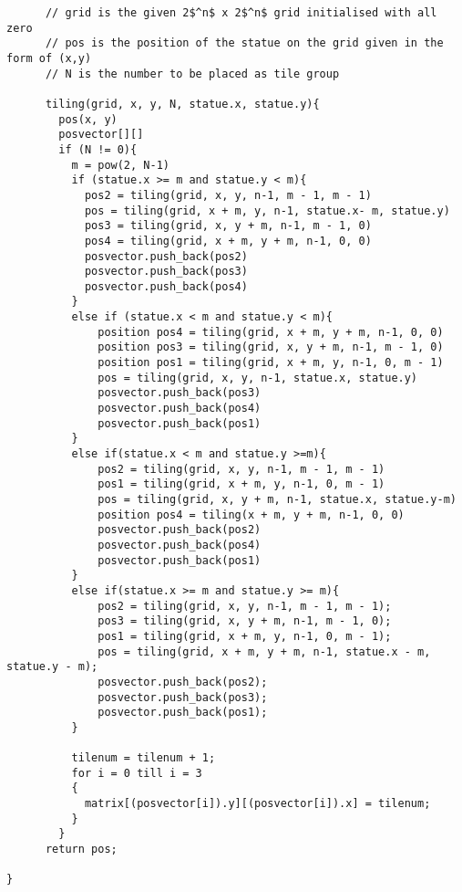 \documentclass{article}
\begin{document}
     \begin{lstlisting}
      // grid is the given 2$^n$ x 2$^n$ grid initialised with all zero
      // pos is the position of the statue on the grid given in the form of (x,y)
      // N is the number to be placed as tile group

      tiling(grid, x, y, N, statue.x, statue.y){
        pos(x, y)
        posvector[][]
        if (N != 0){
          m = pow(2, N-1)
          if (statue.x >= m and statue.y < m){
            pos2 = tiling(grid, x, y, n-1, m - 1, m - 1)
            pos = tiling(grid, x + m, y, n-1, statue.x- m, statue.y)
            pos3 = tiling(grid, x, y + m, n-1, m - 1, 0)
            pos4 = tiling(grid, x + m, y + m, n-1, 0, 0)
            posvector.push_back(pos2)
            posvector.push_back(pos3)
            posvector.push_back(pos4)
          }  
          else if (statue.x < m and statue.y < m){
              position pos4 = tiling(grid, x + m, y + m, n-1, 0, 0)
              position pos3 = tiling(grid, x, y + m, n-1, m - 1, 0)
              position pos1 = tiling(grid, x + m, y, n-1, 0, m - 1)
              pos = tiling(grid, x, y, n-1, statue.x, statue.y)
              posvector.push_back(pos3)
              posvector.push_back(pos4)
              posvector.push_back(pos1) 
          }     
          else if(statue.x < m and statue.y >=m){
              pos2 = tiling(grid, x, y, n-1, m - 1, m - 1)
              pos1 = tiling(grid, x + m, y, n-1, 0, m - 1)
              pos = tiling(grid, x, y + m, n-1, statue.x, statue.y-m)
              position pos4 = tiling(x + m, y + m, n-1, 0, 0)
              posvector.push_back(pos2)
              posvector.push_back(pos4)
              posvector.push_back(pos1)
          }
          else if(statue.x >= m and statue.y >= m){
              pos2 = tiling(grid, x, y, n-1, m - 1, m - 1);
              pos3 = tiling(grid, x, y + m, n-1, m - 1, 0);
              pos1 = tiling(grid, x + m, y, n-1, 0, m - 1);
              pos = tiling(grid, x + m, y + m, n-1, statue.x - m, statue.y - m);
              posvector.push_back(pos2);
              posvector.push_back(pos3);
              posvector.push_back(pos1);
          }
        
          tilenum = tilenum + 1;
          for i = 0 till i = 3
          {
            matrix[(posvector[i]).y][(posvector[i]).x] = tilenum;
          }
        }
      return pos;
  
}  


       \end{lstlisting} 
    
\end{document}

